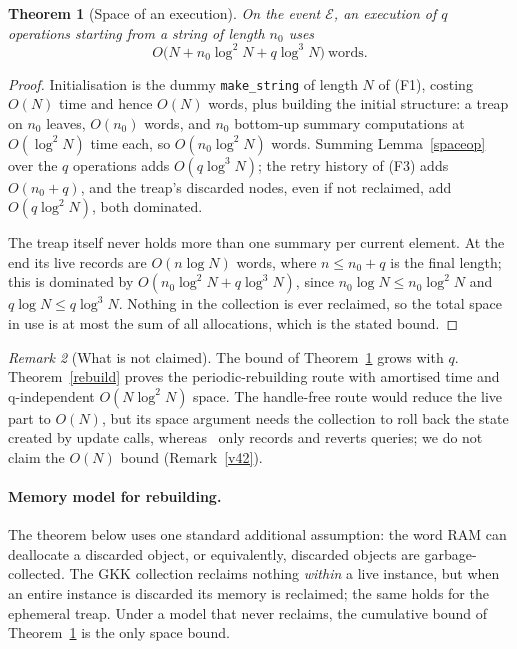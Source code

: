 ﻿\documentclass[11pt]{article}
\theoremstyle{plain}
\newtheorem{theorem}{Theorem}
\theoremstyle{remark}
\newtheorem{remark}[theorem]{Remark}
\begin{document}
\begin{theorem}[Space of an execution]\label{spacetot}
On the event $\mathcal E$, an execution of $q$ operations starting from a string of length $n_0$ uses
\[
O\bigl(N+n_0\log^2N+q\log^3N\bigr)\ \text{words}.
\]
\end{theorem}
\begin{proof}
Initialisation is the dummy \texttt{make\_string} of length $N$ of (F1), costing $O(N)$ time and hence $O(N)$ words, plus building the initial structure: a treap on $n_0$ leaves, $O(n_0)$ words, and $n_0$ bottom-up summary computations at $O(\log^2N)$ time each, so $O(n_0\log^2N)$ words. Summing Lemma~\ref{spaceop} over the $q$ operations adds $O(q\log^3N)$; the retry history of (F3) adds $O(n_0+q)$, and the treap's discarded nodes, even if not reclaimed, add $O(q\log^2N)$, both dominated.

The treap itself never holds more than one summary per current element. At the end its live records are $O(n\log N)$ words, where $n\le n_0+q$ is the final length; this is dominated by $O(n_0\log^2N+q\log^3N)$, since $n_0\log N\le n_0\log^2N$ and $q\log N\le q\log^3N$. Nothing in the collection is ever reclaimed, so the total space in use is at most the sum of all allocations, which is the stated bound.
\end{proof}

\begin{remark}[What is not claimed]\label{nospace}
The bound of Theorem~\ref{spacetot} grows with $q$. Theorem~\ref{rebuild} proves the periodic-rebuilding route with amortised time and q-independent $O(N\log^2N)$ space. The handle-free route would reduce the live part to $O(N)$, but its space argument needs the collection to roll back the state created by update calls, whereas~\cite[App.~A]{GKK} only records and reverts queries; we do not claim the $O(N)$ bound (Remark~\ref{v42}).
\end{remark}

\paragraph{Memory model for rebuilding.}
The theorem below uses one standard additional assumption: the word RAM can deallocate a discarded object, or equivalently, discarded objects are garbage-collected. The GKK collection reclaims nothing \emph{within} a live instance, but when an entire instance is discarded its memory is reclaimed; the same holds for the ephemeral treap. Under a model that never reclaims, the cumulative bound of Theorem~\ref{spacetot} is the only space bound.
\end{document}
